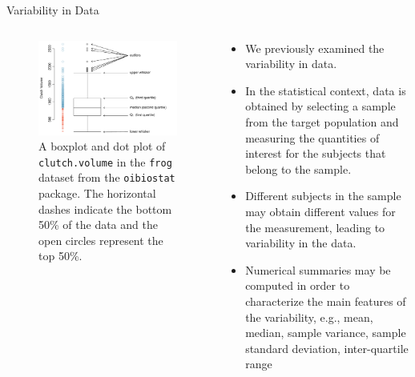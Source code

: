 \documentclass[10pt]{beamer}\usepackage[]{graphicx}\usepackage[]{color}
\makeatletter
\def\maxwidth{ %
  \ifdim\Gin@nat@width>\linewidth
    \linewidth
  \else
    \Gin@nat@width
  \fi
}
\newenvironment{knitrout}{}{} %
\makeatother
\begin{document}
\begin{frame}[fragile]{Variability in Data}
	\begin{columns}
		\begin{column}{0.5\textwidth}  %
\begin{knitrout}\tiny
{}\color{fgcolor}\begin{figure}

{\centering \includegraphics[width=\maxwidth]{figure/unnamed-chunk-1-1} 

}

\caption{A boxplot and dot plot of \texttt{clutch.volume} in the \texttt{frog} dataset from the \texttt{oibiostat} package. The horizontal dashes indicate the bottom 50\% of the data and the open circles represent the top 50\%.}\label{fig:unnamed-chunk-1}
\end{figure}

\end{knitrout}
		\end{column}
		\begin{column}{0.5\textwidth}
			\begin{itemize}
				\item We previously examined the variability in data. 
				\item In the statistical context, data is obtained by selecting a sample from the
				target population and measuring the quantities of interest for the
				subjects that belong to the sample. 
				\item Different subjects in the sample may obtain different values for the measurement, leading to variability in
				the data.
				\item Numerical summaries may be computed in order to characterize the main
				features of the variability, e.g., mean, median, sample variance, sample standard deviation, inter-quartile range
			\end{itemize}
		\end{column}
	\end{columns}
\end{frame}
\end{document}
